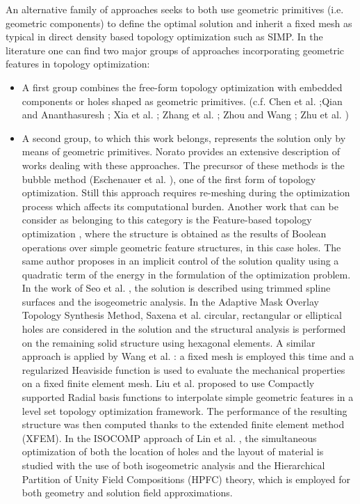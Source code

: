 An alternative family of approaches seeks to both use geometric primitives (i.e. geometric components) to define the optimal solution and inherit a fixed mesh as typical in direct density based topology optimization such as SIMP. In the literature one can find two major groups of approaches incorporating geometric features in topology optimization: 
\begin{itemize}
    \item A first group combines the free-form topology optimization with embedded components or holes shaped as geometric primitives. (c.f. Chen et al. \cite{chen2007shape};Qian and Ananthasuresh \cite{qian2004optimal}; Xia et al. \cite{xia2012sensitivity}; Zhang et al. \cite{zhang2011some,zhang2015explicit}; Zhou and Wang \cite{zhou2013engineering}; Zhu et al. \cite{zhu2008simultaneous})
    \item A second group, to which this work belongs, represents the solution only by means of geometric primitives.
    Norato \cite{norato2018topology} provides an extensive description of works dealing with these approaches. The precursor of these methods is the bubble method (Eschenauer et al. \cite{eschenauer1994bubble}), one of the first form of topology optimization. Still this approach requires re-meshing during the optimization process which affects its computational burden. Another work that can be consider as belonging to this category is the Feature-based topology optimization \cite{cheng2006feature}, where the structure is obtained as the results of Boolean operations over simple geometric feature structures, in this case holes. The same author proposes  in \cite{chen2008shape} an implicit control of the solution quality using a quadratic term of the energy in the formulation of the optimization problem. In the work of Seo et al. \cite{seo2010isogeometric}, the solution is described using  trimmed spline surfaces and the isogeometric analysis. In the Adaptive Mask
    Overlay Topology Synthesis
    Method, Saxena et al. \cite{saxena2011circular} circular, rectangular or elliptical holes are considered in the solution and the structural analysis is performed on the remaining solid structure using hexagonal elements.
    A similar approach is applied by Wang et al. \cite{wang2012high}: a fixed mesh is employed this time and a regularized Heaviside function is used to evaluate the mechanical properties on a fixed finite element mesh. Liu et al. \cite{liu2014level} proposed to use Compactly supported Radial basis functions to interpolate simple geometric features in a level set topology optimization framework. The performance of the resulting structure was then computed thanks to the extended finite element method (XFEM). 
    In the ISOCOMP approach of Lin et al. \cite{lin2015isocomp}, 
    the simultaneous optimization of both the location of holes and the layout of material is studied with the use of both isogeometric analysis and the Hierarchical Partition of Unity Field Compositions (HPFC) theory, which is employed for both geometry and solution field approximations.
    \\ 
\end{itemize}

